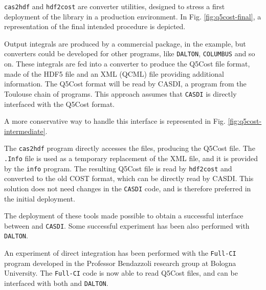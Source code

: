 \texttt{cas2hdf} and \texttt{hdf2cost} are converter utilities, designed to
stress a first deployment of the library in a production environment.  In
Fig. \ref{fig:q5cost-final}, a representation of the final intended
procedure is depicted.

Output integrals are produced by a commercial package, \molcas in the
example, but converters could be developed for other programs, like
\texttt{DALTON}, \texttt{COLUMBUS} and so on. These integrals are fed into a converter to
produce the Q5Cost file format, made of the HDF5 file and an XML (QCML) file
providing additional information. The Q5Cost format will be read by
CASDI, a program from the Toulouse chain of programs. This
approach assumes that \texttt{CASDI} is directly interfaced with the Q5Cost format. 

A more conservative way to handle this interface is represented in Fig.
\ref{fig:q5cost-intermediate}.

The \texttt{cas2hdf} program directly accesses the \molcas files, producing the
Q5Cost file. The \texttt{.Info} file is used as a temporary replacement of
the XML file, and it is provided by the \texttt{info} program.
The resulting Q5Cost file is read by \texttt{hdf2cost} and converted to the
old COST format, which can be directly read by CASDI.  This solution does
not need changes in the \texttt{CASDI} code, and is therefore preferred in the
initial deployment.

The deployment of these tools made possible to obtain a successful
interface between \molcas and \texttt{CASDI}. Some successful experiment has been also
performed with \texttt{DALTON}.

An experiment of direct integration has been performed with the
\texttt{Full-CI}\cite{cpl-252-437-1996,ijqc-48-287-2004} program developed
in the Professor Bendazzoli research group at Bologna University. The
\texttt{Full-CI} code is now able to read Q5Cost files, and can be
interfaced with both \molcas and \texttt{DALTON}.

